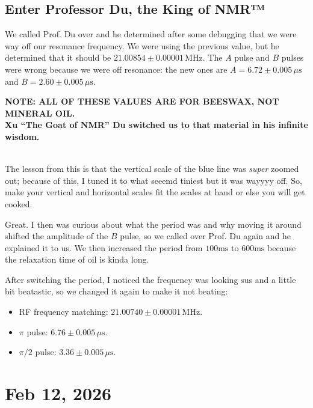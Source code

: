 \documentclass[11pt]{article}
\begin{document}
\subsection{Enter Professor Du, the King of NMR™ \du}

We called Prof. Du over and he determined after some debugging that
we were way off our resonance frequency. We were using the previous
value, but he determined that it should be $21.00854 \pm 0.00001 \, \mathrm{MHz}$.
The $A$ pulse and $B$ pulses were wrong because we were off resonance:
the new ones are $A = 6.72 \pm 0.005 \, \mu \mathrm{s}$ and $B = 2.60 \pm 0.005 \, \mu \mathrm{s}$.\\

\begin{centering}
    \textbf{NOTE: ALL OF THESE VALUES ARE FOR BEESWAX, NOT MINERAL OIL.\\
    Xu ``The Goat of NMR'' Du switched us to that material in his infinite wisdom.}
\end{centering}\\

The lesson from this is that the vertical scale of the blue line was \emph{super}
zoomed out; because of this, I tuned it to what seeemd tiniest but it was wayyyy
off. So, make your vertical and horizontal scales fit the scales at hand or else
you will get cooked.

Great. I then was curious about what the period was and why moving it around
shifted the amplitude of the $B$ pulse, so we called over Prof. Du again
and he explained it to us. We then increased the period from $100 \mathrm{ms}$
to $600 \mathrm{ms}$ because the relaxation time of oil is kinda long.

After switching the period, I noticed the frequency was looking sus
and a little bit beatastic, so we changed it again to make it not beating:

\begin{itemize}
    \item RF frequency matching: $21.00740 \pm 0.00001 \, \mathrm{MHz}$.
    \item $\pi$ pulse: $6.76 \pm 0.005 \, \mu \mathrm{s}$.
    \item $\pi/2$ pulse: $3.36 \pm 0.005 \, \mu \mathrm{s}$.
\end{itemize}

\section{Feb 12, 2026}
\end{document}
